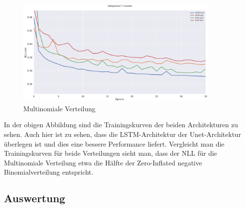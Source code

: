 \begin{figure}[htb]
 \centering
 \includegraphics[width=0.9\textwidth,angle=0]{abb/Categorical.png}
 \caption{Multinomiale Verteilung}
\label{fig:multinomialeVerteilung}
\end{figure}

\noindent In der obigen Abbildung sind die Trainingskurven der beiden Architekturen zu sehen. Auch hier ist zu sehen, dass die LSTM-Architektur der Unet-Architektur überlegen ist und dies eine bessere Performance liefert. Vergleicht man die Trainingskurven für beide Verteilungen sieht man, dass der NLL für die Multinomiale Verteilung etwa die Hälfte der Zero-Inflated negative Binomialverteilung entspricht.

\newpage
\subsection{Auswertung}



